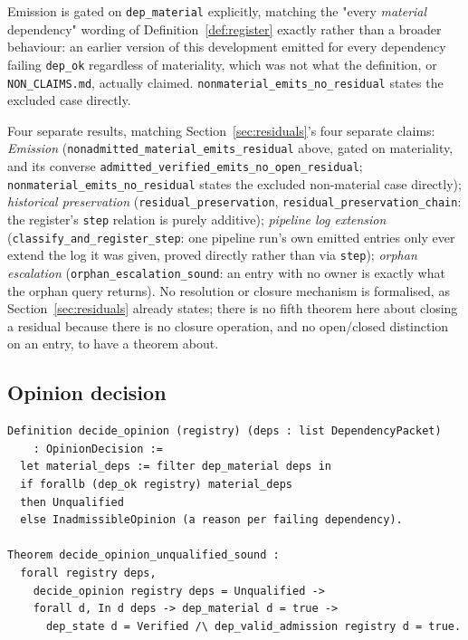 \documentclass[smallcondensed,envcountsect,natbib]{svjour3}
\begin{document}
Emission is gated on \texttt{dep\_material} explicitly, matching the "every \emph{material} dependency" wording of Definition~\ref{def:register} exactly rather than a broader behaviour: an earlier version of this development emitted for every dependency failing \texttt{dep\_ok} regardless of materiality, which was not what the definition, or \texttt{NON\_CLAIMS.md}, actually claimed. \texttt{nonmaterial\_emits\_no\_residual} states the excluded case directly.

Four separate results, matching Section~\ref{sec:residuals}'s four separate claims: \emph{Emission} (\texttt{nonadmitted\_material\_emits\_residual} above, gated on materiality, and its converse \texttt{admitted\_verified\_emits\_no\_open\_residual}; \texttt{nonmaterial\_emits\_no\_residual} states the excluded non-material case directly); \emph{historical preservation} (\texttt{residual\_preservation}, \texttt{residual\_preservation\_chain}: the register's \texttt{step} relation is purely additive); \emph{pipeline log extension} (\texttt{classify\_and\_register\_step}: one pipeline run's own emitted entries only ever extend the log it was given, proved directly rather than via \texttt{step}); \emph{orphan escalation} (\texttt{orphan\_escalation\_sound}: an entry with no owner is exactly what the orphan query returns). No resolution or closure mechanism is formalised, as Section~\ref{sec:residuals} already states; there is no fifth theorem here about closing a residual because there is no closure operation, and no open/closed distinction on an entry, to have a theorem about.

\subsection*{Opinion decision}

\begin{lstlisting}
Definition decide_opinion (registry) (deps : list DependencyPacket)
    : OpinionDecision :=
  let material_deps := filter dep_material deps in
  if forallb (dep_ok registry) material_deps
  then Unqualified
  else InadmissibleOpinion (a reason per failing dependency).

Theorem decide_opinion_unqualified_sound :
  forall registry deps,
    decide_opinion registry deps = Unqualified ->
    forall d, In d deps -> dep_material d = true ->
      dep_state d = Verified /\ dep_valid_admission registry d = true.
\end{lstlisting}
\end{document}
